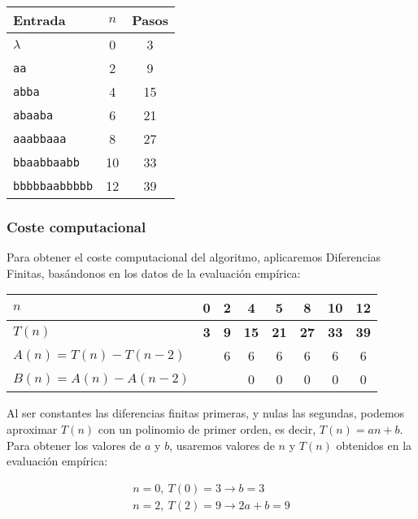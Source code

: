 \begin{table}[h]
    \centering
    \begin{tabular}{lcc}
        Entrada & $n$ & Pasos \\
        \hline
        $\lambda$               & 0  & 3  \\
        \texttt{aa}             & 2  & 9  \\
        \texttt{abba}           & 4  & 15 \\
        \texttt{abaaba}         & 6  & 21 \\
        \texttt{aaabbaaa}       & 8  & 27 \\
        \texttt{bbaabbaabb}     & 10 & 33 \\
        \texttt{bbbbbaabbbbb}   & 12 & 39
    \end{tabular}
\end{table}


\subsubsection*{Coste computacional}
Para obtener el coste computacional del algoritmo, aplicaremos Diferencias Finitas, basándonos en los datos de la evaluación empírica:

\begin{table}[H]
    \centering
    \begin{tabular}{|l|c|c|c|c|c|c|c|}
        \hline
        $n$ & \textbf{0} & \textbf{2} & \textbf{4} & \textbf{5} & \textbf{8} & \textbf{10} & \textbf{12} \\ \hline
        $T(n)$ & \textbf{3} & \textbf{9} & \textbf{15} & \textbf{21} & \textbf{27} & \textbf{33} & \textbf{39} \\ \hline
        \hline
        $A(n) = T(n) - T(n-2)$ &    &  6 &  6 &  6 &  6 &  6 &  6 \\ \hline
        $B(n) = A(n) - A(n-2)$ &    &    & 0 &  0 &  0 &  0 &  0 \\ \hline
    \end{tabular}
    \label{tab:0B}
\end{table}

Al ser constantes las diferencias finitas primeras, y nulas las segundas, podemos aproximar $T(n)$ con un polinomio de primer orden, es decir, $T(n) = an + b$.\\

Para obtener los valores de $a$ y $b$, usaremos valores de $n$ y $T(n)$ obtenidos en la evaluación empírica:

\begin{subequations}
    \begin{gather}
        n = 0,\ T(0) = 3 \rightarrow b = 3 \\
        n = 2,\ T(2) = 9 \rightarrow 2a + b = 9
    \end{gather}
\end{subequations}

